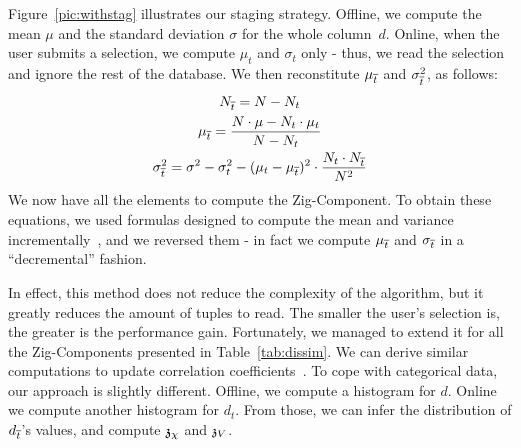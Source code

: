 Figure~\ref{pic:withstag} illustrates our staging strategy. Offline, we compute
the mean $\mu$ and the standard deviation $\sigma$ for the whole column~$d$.
Online, when the user submits a selection, we compute  $\mu_t$ and $\sigma_t$
only - thus, we read the selection and ignore the rest of the database. We then
reconstitute $\mu_{\overline{t}}$ and $\sigma_{\overline{t}}^2$, as follows:
\begin{gather}
    N_{\overline{t}} = N - N_t\\
    \mu_{\overline{t}}= \frac{ N \cdot \mu -  N_t \cdot \mu_t } { N - N_t } \\
    \sigma_{\overline{t}}^2 = \sigma^2 - \sigma_t^2 -
    (\mu_t - \mu_{\overline{t}})^2 \cdot \frac{N_t \cdot N_{\overline{t}}}{N^2}
\end{gather}
We now have all the elements to compute the Zig-Component. To obtain these
equations, we used formulas designed to compute the mean and variance
incrementally~\cite{pebay2008formulas}, and we reversed them - in fact we
compute $\mu_{\overline{t}}$ and $\sigma_{\overline{t}}$ in a ``decremental'' fashion.

In effect, this method does not reduce the complexity of the algorithm, but it
greatly reduces the amount of tuples to read. The smaller the user's selection
is, the greater is the performance gain. Fortunately, we managed to extend it
for all the Zig-Components presented in Table~\ref{tab:dissim}.  We can derive
similar computations to update correlation
coefficients~\cite{pebay2008formulas}. To cope with categorical data, our
approach is slightly different. Offline, we compute a histogram for $d$. Online
we compute another histogram for $d_t$. From those, we can infer the
distribution of $d_{\overline{t}}$'s values, and compute $\mathfrak{z}_\chi$ and $\mathfrak{z}_V$.


